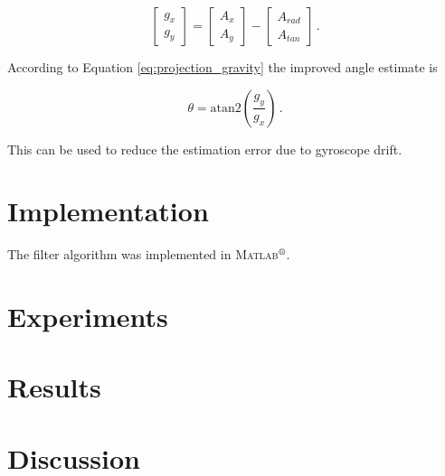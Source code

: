 \begin{equation}
\begin{bmatrix}
    g_x \\
    g_y 
    \end{bmatrix} = 
    \begin{bmatrix}
    A_x \\
    A_y 
    \end{bmatrix} -
    \begin{bmatrix}
    A_{rad} \\
    A_{tan} 
    \end{bmatrix}\,.
\end{equation}

\noindent
According to Equation \ref{eq:projection_gravity} the improved angle estimate is

\begin{equation}
  \theta = \mbox{atan2}(\frac{g_y}{g_x})\,.
\end{equation}

\noindent
This can be used to reduce the estimation error due to gyroscope drift.
 
\section{Implementation}

The filter algorithm was implemented in \textsc{Matlab}$\textsuperscript{\textregistered}$.

\section{Experiments}

\section{Results}

\section{Discussion}

